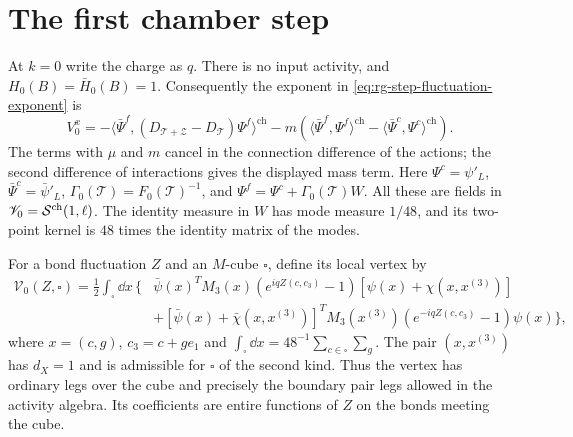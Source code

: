 \section{The first chamber step}\label{subsec:rg-step-first-vertex}

At $k=0$ write the charge as $q$.
There is no input activity, and $H_0(B)=\bar H_0(B)=1$.
Consequently the exponent in
\eqref{eq:rg-step-fluctuation-exponent} is
\begin{equation}\label{eq:rg-step-first-exponent}
 V_0^x=
  -\langle\bar\Psi^f,(D_{\mathscr T+\mathscr Z}
                                    -D_{\mathscr T})\Psi^f\rangle^{\mathrm{ch}}
  -m\left(\langle\bar\Psi^f,\Psi^f\rangle^{\mathrm{ch}}
                   -\langle\bar\Psi^c,\Psi^c\rangle^{\mathrm{ch}}\right).
\end{equation}
The terms with $\mu$ and $m$ cancel in the connection
difference of the actions; the second difference
of interactions gives the displayed mass term.
Here $\Psi^c=\psi'_L$, $\bar\Psi^c=\bar\psi'_L$,
$\Gamma_0(\mathscr T)=F_0(\mathscr T)^{-1}$,
and $\Psi^f=\Psi^c+\Gamma_0(\mathscr T)W$.
All these are fields in $\mathscr V_0=\mathcal S^{\mathrm{ch}}(1,\ell)$.
The identity measure in $W$ has mode measure $1/48$,
and its two-point kernel is $48$ times the identity
matrix of the modes.

For a bond fluctuation $Z$ and an $M$-cube $\square$,
define its local vertex by
\begin{equation}\label{eq:rg-step-first-vertex}
 \begin{split}
 \mathcal V_0(Z,\square)=\frac12\int_\square\dd x\,
   \Big\{&
    \bar\psi(x)^TM_3(x)(e^{iqZ(c,c_3)}-1)
                                  [\psi(x)+\chi(x,x^{(3)})]\\
    &+[\bar\psi(x)+\bar\chi(x,x^{(3)})]^T
               M_3(x^{(3)})(e^{-iqZ(c,c_3)}-1)\psi(x)\Big\},
 \end{split}
\end{equation}
where $x=(c,g)$, $c_3=c+ge_1$ and
$\int_\square\dd x=48^{-1}\sum_{c\in\square}\sum_g$.
The pair $(x,x^{(3)})$ has $d_X=1$ and is admissible
for $\square$ of the second kind. Thus the vertex
has ordinary legs over the cube and precisely the
boundary pair legs allowed in the activity algebra.
Its coefficients are entire functions of $Z$ on
the bonds meeting the cube.

